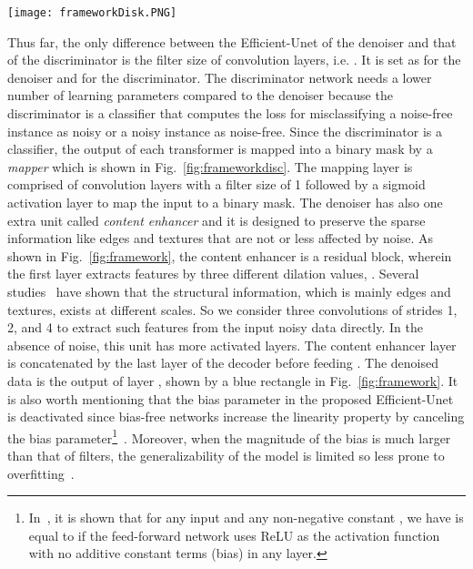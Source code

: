 \documentclass[journal,twoside,web]{ieeecolor}
\begin{document}
\begin{figure*} \centering
    \texttt{[image: frameworkDisk.PNG]}
\caption{Framework of the proposed Efficient-Unet for discriminator with the training steps.}
\label{fig:frameworkdisc}
\end{figure*}


Thus far, the only difference between the Efficient-Unet of the denoiser and that of the discriminator is the filter size of convolution layers, i.e. . 
It is set as  for the denoiser and  for the discriminator.
The discriminator network needs a lower number of learning parameters compared to the denoiser because the discriminator is a classifier that computes the loss for misclassifying a noise-free instance as noisy or a noisy instance as noise-free. Since the discriminator is a classifier, the output of each transformer is mapped into a binary mask by a \textit{mapper} which is shown in Fig.~\ref{fig:frameworkdisc}. The mapping layer is comprised of convolution layers with a filter size of 1 followed by a sigmoid activation layer to map the input to a binary mask. 
The denoiser has also one extra unit called \textit{content enhancer} and it is designed to preserve the sparse information like edges and textures that are not or less affected by noise. 
As shown in Fig.~\ref{fig:framework}, the content enhancer is a residual block, wherein the first layer extracts features by three different dilation values, . Several studies~\cite{ghahremani2020ffd,starck2007undecimated} have shown that the structural information, which is mainly edges and textures, exists at different scales. So we consider three convolutions of strides 1, 2, and 4 to extract such features from the input noisy data directly. In the absence of noise, this unit has more activated layers. The content enhancer layer is concatenated by the last layer of the decoder before feeding . The denoised data  is the output of layer , shown by a blue rectangle in Fig.~\ref{fig:framework}. It is also worth mentioning that the bias parameter in the proposed Efficient-Unet is deactivated since bias-free networks increase the linearity property by canceling the bias parameter\footnote{In~\cite{mohan2019robust}, it is shown that for any input  and any non-negative constant , we have  is equal to  if the feed-forward network uses ReLU as the activation function with no additive constant terms (bias) in any layer.}~\cite{mohan2019robust}. Moreover, when the magnitude of the bias is much larger than that of filters, the generalizability of the model is limited so less prone to overfitting~\cite{zhang2021plug}.
\end{document}
